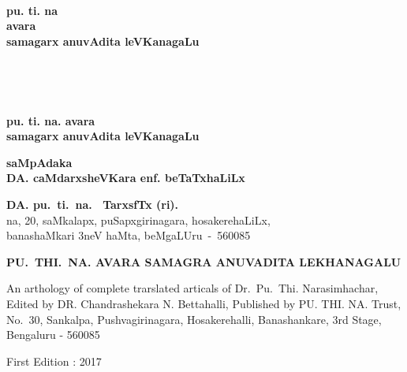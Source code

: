 
\thispagestyle{empty}
~\phantom{a}
\vfill

\begin{center}
{\huge\bf pu. ti. na}\\[15pt]
{\huge\bf avara}\\[15pt]
{\huge\bf samagarx anuvAdita leVKanagaLu}
\end{center}

\vfill
\eject

\thispagestyle{empty}
~\phantom{a}
\vfill

\vfill
\eject

\thispagestyle{empty}
~\phantom{a}

\begin{center}
{\LARGE\bf pu. ti. na. avara}\\[5pt]
{\LARGE\bf samagarx anuvAdita leVKanagaLu}
\end{center}

\vfill

\begin{center}
{\bf saMpAdaka}\\[5pt]
{\Large\bf DA. caMdarxsheVKara enf. beTaTxhaLiLx}
\end{center}

\vfill

\begin{center}
{\large\bf DA. pu.~ti.~na.~ TarxsfTx (ri).}\\[2pt]
na, 20, saMkalapx, puSapxgirinagara, hosakerehaLiLx,\\[2pt]
banashaMkari 3neV haMta, beMgaLUru~-~560085
\end{center}

\eject

\thispagestyle{empty}

\noindent
{\fontsize{8}{8pt}\selectfont\rm\bfseries PU.~THI.~NA. AVARA SAMAGRA ANUVADITA LEKHANAGALU}

\bigskip

\noindent
{\rm An arthology of complete trarslated articals of Dr.~Pu.~Thi. Narasimhachar, Edited by DR. Chandrashekara N. Bettahalli, Published by PU. THI. NA. Trust, No.~30, Sankalpa, Pushvagirinagara, Hosakerehalli, Banashankare, 3rd Stage, Bengaluru - 560085}

\vskip 1.2cm

\noindent
{\rm First Edition : 2017}

\vskip 1.2cm

